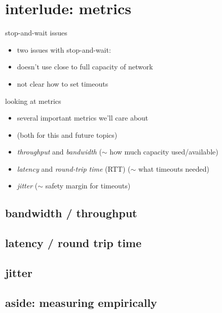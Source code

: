 


\section{interlude: metrics}
\begin{frame}{stop-and-wait issues}
    \begin{itemize}
    \item two issues with stop-and-wait:
    \vspace{.5cm}
    \item doesn't use close to full capacity of network
    \item not clear how to set timeouts
    \end{itemize}
\end{frame}

\begin{frame}{looking at metrics}
    \begin{itemize}
    \item several important metrics we'll care about
    \item (both for this and future topics)
    \vspace{.5cm}
    \item<2-> \textit{throughput} and \textit{bandwidth} ($\sim$ how much capacity used/available)
    \item<2-> \textit{latency} and \textit{round-trip time} (RTT) ($\sim$ what timeouts needed)
    \item<2-> \textit{jitter} ($\sim$ safety margin for timeouts)
    \end{itemize}
\end{frame}

\subsection{bandwidth / throughput}


\subsection{latency / round trip time}


\subsection{jitter}


\subsection{aside: measuring empirically}


